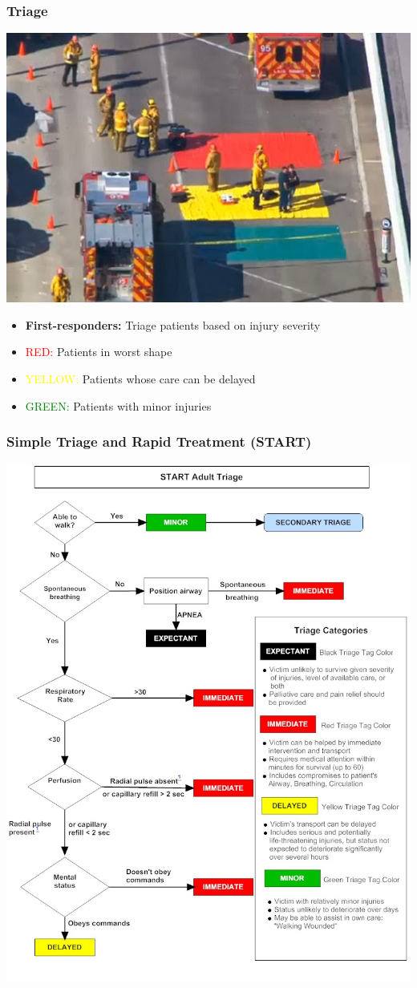 \documentclass{beamer}
\begin{document}
\begin{frame}
  \frametitle{Triage}
  \begin{minipage}[c]{.45\textwidth}
    \includegraphics[width=1\textwidth]{EMSTriage}
  \end{minipage}
  \begin{minipage}[c]{.45\textwidth}
    \begin{itemize}
      \item \textbf{First-responders:} Triage patients based on injury severity
      \item \textcolor{red}{RED:} Patients in worst shape
      \item \textcolor{yellow}{YELLOW:} Patients whose care can be delayed
      \item \textcolor{green}{GREEN:} Patients with minor injuries
    \end{itemize}
  \end{minipage}
\end{frame}

\begin{frame}
  \frametitle{Simple Triage and Rapid Treatment (START)}
  \centering
  \includegraphics[width=.5\textwidth]{StartAdultTriageAlgorithm}
\end{frame}
\end{document}
